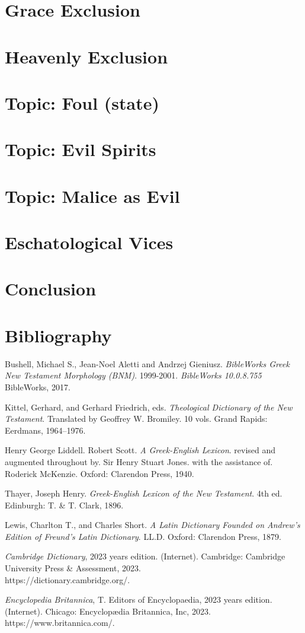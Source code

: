 \documentclass[a4paper,twocolumn,twoside,notitlepage,10pt]{article}
\begin{document}
\section{Grace Exclusion}
\section{Heavenly Exclusion}
\section{Topic: Foul (state)}
\section{Topic: Evil Spirits}
\section{Topic: Malice as Evil}
\section{Eschatological Vices}

\section{Conclusion}

\section{Bibliography}
\begin{description}
	\item Bushell, Michael S., Jean-Noel Aletti and Andrzej Gieniusz. \emph{BibleWorks Greek New Testament Morphology (BNM)}. 1999-2001. \emph{BibleWorks 10.0.8.755} BibleWorks, 2017.
	\item Kittel, Gerhard, and Gerhard Friedrich, eds. \emph{Theological Dictionary of the New Testament}. Translated by Geoffrey W. Bromiley. 10 vols. Grand Rapids: Eerdmans, 1964--1976.
	\item Henry George Liddell. Robert Scott.  \emph{A Greek-English Lexicon}. revised and augmented throughout by. Sir Henry Stuart Jones. with the assistance of. Roderick McKenzie. Oxford: Clarendon Press, 1940.
	\item Thayer, Joseph Henry. \emph{Greek-English Lexicon of the New Testament}. 4th ed. Edinburgh: T. \& T. Clark, 1896.
	\item Lewis, Charlton T., and Charles Short. \emph{A Latin Dictionary Founded on Andrew's Edition of Freund's Latin Dictionary}. LL.D. Oxford: Clarendon Press, 1879.
	\item \emph{Cambridge Dictionary}, 2023 years edition. (Internet). Cambridge: Cambridge University Press \& Assessment, 2023.\\ https://dictionary.cambridge.org/.
	\item  \emph{Encyclopedia Britannica}, T. Editors of Encyclopaedia, 2023 years edition. (Internet). Chicago: Encyclopædia Britannica, Inc, 2023.\\https://www.britannica.com/.
\end{description}

\onecolumn
\printindex[eng]
\printindex[grc]
\end{document}
